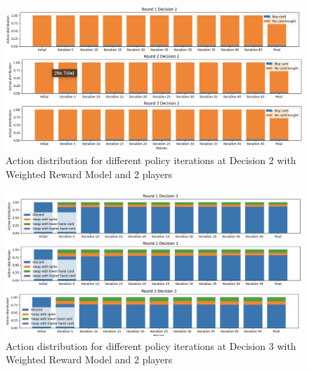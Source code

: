 \documentclass{article}
\begin{document}
    \begin{figure}[H]
    \centering
        \includegraphics[width=\textwidth]{report/figures/weighted_r_d2.png}
        \caption{Action distribution for different policy iterations at Decision 2 with Weighted Reward Model and 2 players}
        \label{fig:weight_dec2_distribution}
    \end{figure}
    
    \begin{figure}[H]
    \centering
        \includegraphics[width=\textwidth]{report/figures/weighted_r_d3.png}
        \caption{Action distribution for different policy iterations at Decision 3 with Weighted Reward Model and 2 players}
        \label{fig:weight_dec3_distribution}
    \end{figure}
\end{document}
